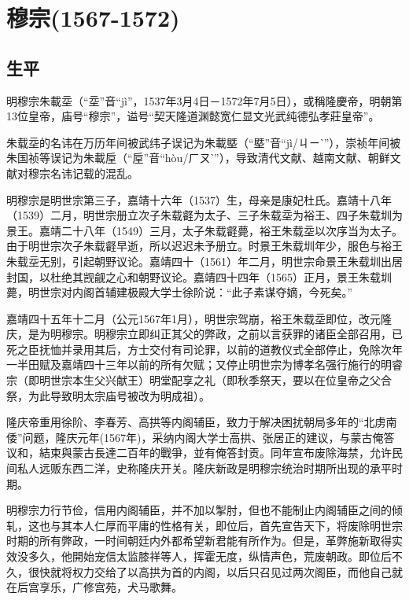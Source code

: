 
\section{穆宗\tiny(1567-1572)}

\subsection{生平}

明穆宗朱載坖（“坖”音“jì”，1537年3月4日－1572年7月5日），或稱隆慶帝，明朝第13位皇帝，庙号“穆宗”，谥号“契天隆道渊懿宽仁显文光武纯德弘孝莊皇帝”。

朱载坖的名讳在万历年间被武纬子误记为朱載塈（“塈”音“jì/ㄐㄧˋ”），崇祯年间被朱国祯等误记为朱載垕（“垕”音“hòu/ㄏㄡˋ”），导致清代文献、越南文献、朝鲜文献对穆宗名讳记载的混乱。

明穆宗是明世宗第三子，嘉靖十六年（1537）生，母亲是康妃杜氏。嘉靖十八年（1539）二月，明世宗册立次子朱载壡为太子、三子朱载坖为裕王、四子朱载圳为景王。嘉靖二十八年（1549）三月，太子朱载壡薨，裕王朱载坖以次序当为太子。由于明世宗次子朱载壡早逝，所以迟迟未予册立。时景王朱载圳年少，服色与裕王朱载坖无别，引起朝野议论。嘉靖四十（1561）年二月，明世宗命景王朱载圳出居封国，以杜绝其觊觎之心和朝野议论。嘉靖四十四年（1565）正月，景王朱载圳薨，明世宗对内阁首辅建极殿大学士徐阶说：“此子素谋夺嫡，今死矣。”

嘉靖四十五年十二月（公元1567年1月），明世宗驾崩，裕王朱载坖即位，改元隆庆，是为明穆宗。明穆宗立即纠正其父的弊政，之前以言获罪的诸臣全部召用，已死之臣抚恤并录用其后，方士交付有司论罪，以前的道教仪式全部停止，免除次年一半田赋及嘉靖四十三年以前的所有欠赋；又停止明世宗为博孝名强行施行的明睿宗（即明世宗本生父兴献王）明堂配享之礼（即秋季祭天，要以在位皇帝之父合祭，为此导致明太宗庙号被改为明成祖）。

隆庆帝重用徐阶、李春芳、高拱等内阁辅臣，致力于解决困扰朝局多年的“北虏南倭”问题，隆庆元年(1567年)，采纳内阁大学士高拱、张居正的建议，与蒙古俺答议和，結束與蒙古長達二百年的戰爭，並有俺答封贡。同年宣布废除海禁，允许民间私人远贩东西二洋，史称隆庆开关。隆庆新政是明穆宗统治时期所出现的承平时期。

明穆宗力行节俭，信用内阁辅臣，并不加以掣肘，但也不能制止内阁辅臣之间的倾轧，这也与其本人仁厚而平庸的性格有关，即位后，首先宣告天下，将废除明世宗时期的所有弊政，一时间朝廷内外都希望新君能有所作为。但是，革弊施新取得实效没多久，他開始宠信太监膝祥等人，挥霍无度，纵情声色，荒废朝政。即位后不久，很快就将权力交给了以高拱为首的内阁，以后只召见过两次阁臣，而他自己就在后宫享乐，广修宫苑，犬马歌舞。


